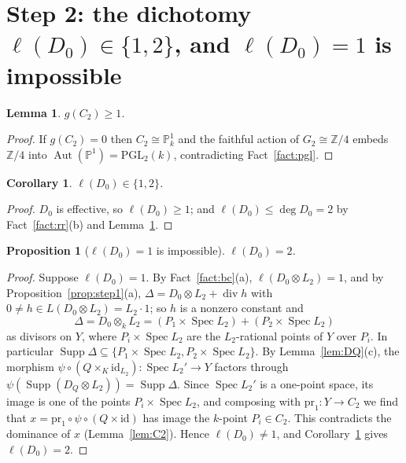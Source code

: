 \documentclass[11pt]{amsart}
\newtheorem{proposition}[theorem]{Proposition}
\newtheorem{lemma}[theorem]{Lemma}
\newtheorem{corollary}[theorem]{Corollary}
\theoremstyle{definition}
\theoremstyle{remark}
\newcommand{\Z}{\mathbb Z}
\newcommand{\PP}{\mathbb P}
\newcommand{\Aut}{\operatorname{Aut}}
\newcommand{\Spec}{\operatorname{Spec}}
\newcommand{\Supp}{\operatorname{Supp}}
\newcommand{\divv}{\operatorname{div}}
\begin{document}
\section{Step 2: the dichotomy \texorpdfstring{$\ell(D_0)\in\{1,2\}$}{l(D0) in \{1,2\}}, and \texorpdfstring{$\ell(D_0)=1$}{l(D0)=1} is impossible}\label{sec:step2}

\begin{lemma}\label{lem:genus}
$g(C_2)\ge1$.
\end{lemma}

\begin{proof}
If $g(C_2)=0$ then $C_2\cong\PP^1_k$ and the faithful action of $G_2\cong\Z/4$ embeds
$\Z/4$ into $\Aut(\PP^1)=\mathrm{PGL}_2(k)$, contradicting Fact~\ref{fact:pgl}.
\end{proof}

\begin{corollary}\label{cor:l12}
$\ell(D_0)\in\{1,2\}$.
\end{corollary}

\begin{proof}
$D_0$ is effective, so $\ell(D_0)\ge1$; and $\ell(D_0)\le\deg D_0=2$ by
Fact~\ref{fact:rr}(b) and Lemma~\ref{lem:genus}.
\end{proof}

\begin{proposition}[$\ell(D_0)=1$ is impossible]\label{prop:step2a}
$\ell(D_0)=2$.
\end{proposition}

\begin{proof}
Suppose $\ell(D_0)=1$. By Fact~\ref{fact:bc}(a), $\ell(D_0\otimes L_2)=1$, and by
Proposition~\ref{prop:step1}(a), $\Delta=D_0\otimes L_2+\divv h$ with $0\ne h\in L(D_0\otimes L_2)=L_2\cdot1$;
so $h$ is a nonzero constant and
\[
\Delta=D_0\otimes_kL_2=(P_1\times\Spec L_2)+(P_2\times\Spec L_2)
\]
as divisors on $Y$, where $P_i\times\Spec L_2$ are the $L_2$-rational points of $Y$ over
$P_i$. In particular $\Supp\Delta\subseteq\{P_1\times\Spec L_2,P_2\times\Spec L_2\}$.
By Lemma~\ref{lem:DQ}(c), the morphism $\psi\circ(Q\times_K\mathrm{id}_{L_2})\colon\Spec L_2'\to Y$
factors through $\psi(\Supp(D_Q\otimes L_2))=\Supp\Delta$. Since $\Spec L_2'$ is a
one-point space, its image is one of the points $P_i\times\Spec L_2$, and composing with
$\mathrm{pr}_1\colon Y\to C_2$ we find that $x=\mathrm{pr}_1\circ\psi\circ(Q\times\mathrm{id})$
has image the $k$-point $P_i\in C_2$. This contradicts the dominance of $x$
(Lemma~\ref{lem:C2}). Hence $\ell(D_0)\ne1$, and Corollary~\ref{cor:l12} gives $\ell(D_0)=2$.
\end{proof}
\end{document}
